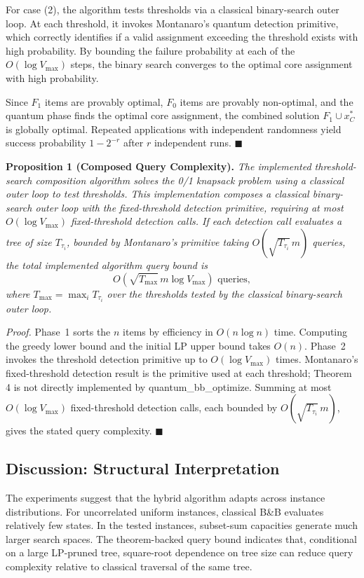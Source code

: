 \documentclass[conference]{IEEEtran} \IEEEoverridecommandlockouts
\begin{document}
For case (2), the algorithm tests thresholds via a classical binary-search outer loop. At each threshold, it invokes Montanaro's quantum detection primitive, which correctly identifies if a valid assignment exceeding the threshold exists with high probability. By bounding the failure probability at each of the $O(\log V_{\max})$ steps, the binary search converges to the optimal core assignment with high probability.

Since $F_1$ items are provably optimal, $F_0$ items are provably non-optimal, and the quantum phase finds the optimal core assignment, the combined solution $F_1 \cup x^*_C$ is globally optimal. Repeated applications with independent randomness yield success probability $1 - 2^{-r}$ after $r$ independent runs. \hfill$\blacksquare$

\textbf{Proposition 1 (Composed Query Complexity).} \textit{The implemented threshold-search composition algorithm solves the 0/1 knapsack problem using a classical outer loop to test thresholds. This implementation composes a classical binary-search outer loop with the fixed-threshold detection primitive, requiring at most $O(\log V_{\max})$ fixed-threshold detection calls. If each detection call evaluates a tree of size $T_{\tau_i}$, bounded by Montanaro's primitive taking $O(\sqrt{T_{\tau_i}}\,m)$ queries, the total implemented algorithm query bound is}
\begin{equation}
    O\!\left(\sqrt{T_{\max}}\,m\log V_{\max}\right) \text{ queries},
    \label{eq:totalcomplexity}
\end{equation}
\textit{where $T_{\max} = \max_i T_{\tau_i}$ over the thresholds tested by the classical binary-search outer loop.}

\textit{Proof.} Phase~1 sorts the $n$ items by efficiency in $O(n \log n)$ time. Computing the greedy lower bound and the initial LP upper bound takes $O(n)$. Phase~2 invokes the threshold detection primitive up to $O(\log V_{\max})$ times. Montanaro's fixed-threshold detection result is the primitive used at each threshold; Theorem 4 is not directly implemented by quantum\_bb\_optimize. Summing at most $O(\log V_{\max})$ fixed-threshold detection calls, each bounded by $O(\sqrt{T_{\tau_i}}\,m)$, gives the stated query complexity. \hfill$\blacksquare$

\subsection{Discussion: Structural Interpretation}
The experiments suggest that the hybrid algorithm adapts across instance distributions. For uncorrelated uniform instances, classical B\&B evaluates relatively few states. In the tested instances, subset-sum capacities generate much larger search spaces. The theorem-backed query bound indicates that, conditional on a large LP-pruned tree, square-root dependence on tree size can reduce query complexity relative to classical traversal of the same tree.
\end{document}
